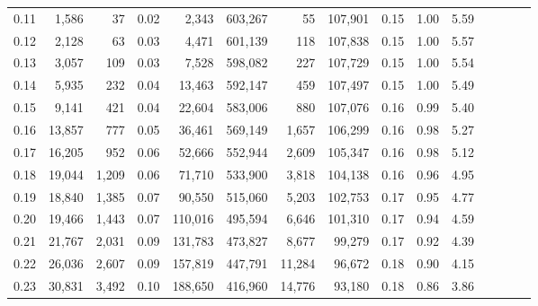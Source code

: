 \begin{tabular}{rrrcrrrrrrrrrrr}
0.11 &   1,586 &     37 &                                       0.02 &    2,343 &  603,267 &       55 &  107,901 &  0.15 &  1.00 &                         5.59 \\
0.12 &   2,128 &     63 &                                       0.03 &    4,471 &  601,139 &      118 &  107,838 &  0.15 &  1.00 &                         5.57 \\
0.13 &   3,057 &    109 &                                       0.03 &    7,528 &  598,082 &      227 &  107,729 &  0.15 &  1.00 &                         5.54 \\
0.14 &   5,935 &    232 &                                       0.04 &   13,463 &  592,147 &      459 &  107,497 &  0.15 &  1.00 &                         5.49 \\
0.15 &   9,141 &    421 &                                       0.04 &   22,604 &  583,006 &      880 &  107,076 &  0.16 &  0.99 &                         5.40 \\
0.16 &  13,857 &    777 &                                       0.05 &   36,461 &  569,149 &    1,657 &  106,299 &  0.16 &  0.98 &                         5.27 \\
0.17 &  16,205 &    952 &                                       0.06 &   52,666 &  552,944 &    2,609 &  105,347 &  0.16 &  0.98 &                         5.12 \\
0.18 &  19,044 &  1,209 &                                       0.06 &   71,710 &  533,900 &    3,818 &  104,138 &  0.16 &  0.96 &                         4.95 \\
0.19 &  18,840 &  1,385 &                                       0.07 &   90,550 &  515,060 &    5,203 &  102,753 &  0.17 &  0.95 &                         4.77 \\
0.20 &  19,466 &  1,443 &                                       0.07 &  110,016 &  495,594 &    6,646 &  101,310 &  0.17 &  0.94 &                         4.59 \\
0.21 &  21,767 &  2,031 &                                       0.09 &  131,783 &  473,827 &    8,677 &   99,279 &  0.17 &  0.92 &                         4.39 \\
0.22 &  26,036 &  2,607 &                                       0.09 &  157,819 &  447,791 &   11,284 &   96,672 &  0.18 &  0.90 &                         4.15 \\
0.23 &  30,831 &  3,492 &                                       0.10 &  188,650 &  416,960 &   14,776 &   93,180 &  0.18 &  0.86 &                         3.86 \\

\end{tabular}
